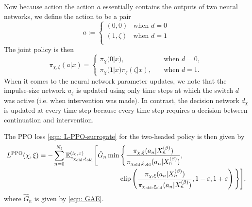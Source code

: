 Now because action the action $a$ essentially contains the outputs of two neural networks, we define the action to be a pair 
\begin{equation*}
    a := \begin{cases}
        (0,0) & \text{when } d = 0 \\[1ex]
        (1,\zeta) & \text{when } d = 1 \\
    \end{cases}
\end{equation*}
The joint policy is then
\begin{equation}
    \pi_{\chi, \xi}(a | x) = 
    \begin{cases}
        \pi_\chi \big(0| x\big), & \quad \text{when } d = 0, \\[1ex]
        \pi_\chi \big(1|x \big) \pi_\xi(\zeta | x), & \quad \text{when } d = 1.
    \end{cases}
    \label{eqn: PPO joint policy}
\end{equation}
When it comes to the neural network parameter updates, we note that the impulse-size network $u_\xi$ is updated using only time steps at which the switch $d$ was active (i.e. when intervention was made). In contrast, the decision network $d_\chi$ is updated at every time step because every time step requires a decision between continuation and intervention. 

The PPO loss \eqref{eqn: L-PPO-surrogate} for the two-headed policy is then given by
\begin{align}
    L^{\text{PPO}}(\chi, \xi) = -\sum_{n=0}^{N_t} \mathbb{E}^{(t_0,x)}_{\pi_{\chi_\text{old}, \xi_\text{old}}} \Bigg[ \hat G_n &\min \Bigg\{ \frac{\pi_{\chi, \xi}(a_n | X^{(\beta)}_n)}{\pi_{\chi_\text{old}, \xi_\text{old}}(a_n |X^{(\beta)}_n)}, \nonumber \\
    & \qquad \text{clip}\left( \frac{\pi_{\chi, \xi}(a_n | X^{(\beta)}_n)}{\pi_{\chi_\text{old}, \xi_\text{old}}(a_n |X^{(\beta)}_n)}, 1-\varepsilon, 1+\varepsilon \right)\Bigg\} \Bigg],
    \label{eqn: L-PPO-surrogate with 2 heads}
\end{align}
where $\hat G_n$ is given by \eqref{eqn: GAE}.

